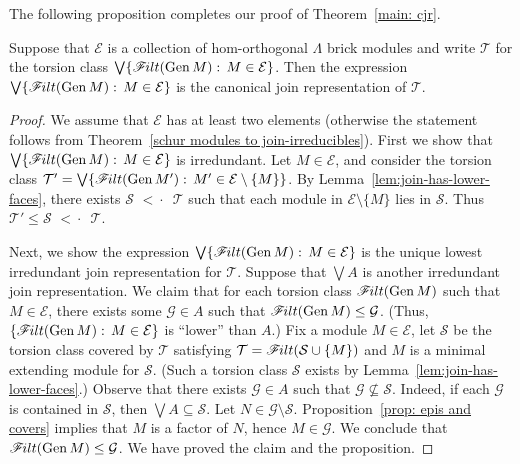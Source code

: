 \documentclass[ALCO,ThmDefs,Unicode,epreuves]{cedram}
\newcommand{\calE}{\mathcal{E}}
\newcommand{\calG}{\mathcal{G}}
\newcommand{\calS}{\mathcal{S}}
\newcommand{\calT}{\mathcal{T}}
\newcommand{\filt}{\mathscr{F}\Mk ilt}
\newcommand{\covered}{{\,\,<\!\!\!\!\cdot\,\,\,}}
\renewcommand{\Join}{\bigvee}
\newcommand{\Gen}{\operatorname{Gen}}
\renewcommand{\1}{\hat{1}}
\newcommand{\0}{\hat{0}}
\newcommand*{\Mk}{\mkern -2mu}
\begin{document}
The following proposition completes our proof of Theorem~\ref{main: cjr}.
\begin{proposition}\label{cjr end}
Suppose that $\calE$ is a collection of hom-orthogonal $\Lambda$ brick modules and write $\calT$ for the torsion class $\Join \{\filt( \Gen M):\,M\in \calE\}$.
Then the expression $\Join \{\filt( \Gen M):\,M\in \calE\}$ is the canonical join representation of $\calT$.
\end{proposition}
\begin{proof}
We assume that $\calE$ has at least two elements (otherwise the statement follows from Theorem~\ref{schur modules to join-irreducibles}).
First we show that $\Join \{\filt(\Gen M):\,M\in \calE\}$ is irredundant.
Let $M\in \calE$, and consider the torsion class $\calT'= \Join \{\filt(\Gen M'):\,M'\in \calE\setminus \{M\}\}$.
By Lemma~\ref{lem:join-has-lower-faces}, there exists $\calS\covered \calT$ such that each module in $\calE\setminus \{M\}$ lies in $\calS$.
Thus $\calT' \le \calS \covered \calT$.

Next, we show the expression $\Join \{\filt(\Gen M):\,M\in \calE\}$ is the unique lowest irredundant join representation for $\calT$.
Suppose that $\Join A$ is another irredundant join representation.
We claim that for each torsion class $\filt(\Gen M)$ such that $M\in \calE$, there exists some $\calG\in A$ such that $\filt(\Gen M) \le \calG$.
(Thus, $\{\filt(\Gen M):\,M\in \calE\}$ is ``lower'' than $A$.)
Fix a module $M\in \calE$, let $\calS$ be the torsion class covered by $\calT$ satisfying $\calT = \filt(\calS \cup \{M\})$ and $M$ is a minimal extending module for $\calS$.
(Such a torsion class $\calS$ exists by Lemma~\ref{lem:join-has-lower-faces}.)
Observe that there exists $\calG\in A$ such that $\calG\not \subseteq \calS$.
Indeed, if each $\calG$ is contained in $\calS$, then $\Join A \subseteq \calS$.
Let $N\in \calG \setminus \calS$.
Proposition~\ref{prop: epis and covers} implies that $M$ is a factor of $N$, hence $M\in \calG$.
We conclude that $\filt(\Gen M) \le \calG$.
We have proved the claim and the proposition.
\end{proof}
\end{document}
